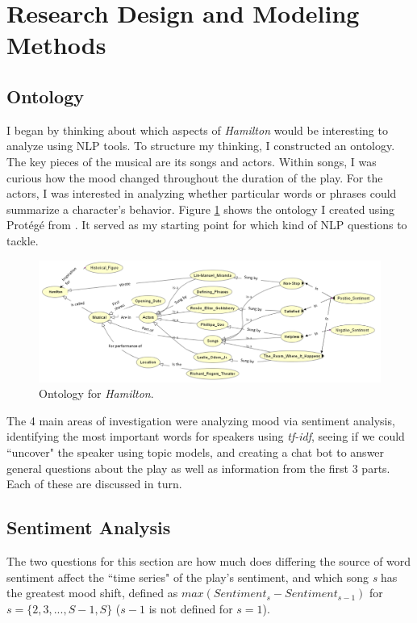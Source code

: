 \documentclass{article}
\begin{document}
\section{Research Design and Modeling Methods}

\subsection{Ontology}

I began by thinking about which aspects of \emph{Hamilton} would be interesting to analyze using NLP tools. To structure my thinking, I constructed an ontology. The key pieces of the musical are its songs and actors. Within songs, I was curious how the mood changed throughout the duration of the play. For the actors, I was interested in analyzing whether particular words or phrases could summarize a character's behavior. Figure \ref{fig:ontology} shows the ontology I created using Prot{\'{e}}g{\'{e}} from \cite{Musen2015}. It served as my starting point for which kind of NLP questions to tackle. 

\begin{figure}[h]
    \caption{Ontology for \emph{Hamilton}. \label{fig:ontology}}
    \centering
    \includegraphics[width=0.7\paperwidth, scale=1.25]{ontology.png}
\end{figure}

The 4 main areas of investigation were analyzing mood via sentiment analysis, identifying the most important words for speakers using \emph{tf-idf}, seeing if we could ``uncover" the speaker using topic models, and creating a chat bot to answer general questions about the play as well as information from the first 3 parts. Each of these are discussed in turn.

\subsection{Sentiment Analysis}

The two questions for this section are how much does differing the source of word sentiment affect the ``time series" of the play's sentiment, and which song \emph{s} has the greatest mood shift, defined as $max(Sentiment_{s} - Sentiment_{s - 1})$ for $s = \{2, 3, ..., S - 1, S\}$ ($s - 1$ is not defined for $s = 1$).
\end{document}
